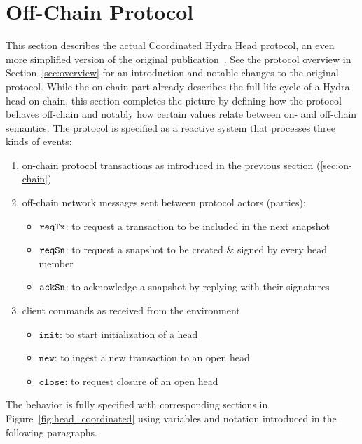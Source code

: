 \section{Off-Chain Protocol}\label{sec:offchain}

This section describes the actual Coordinated Hydra Head protocol, an even more
simplified version of the original publication~\cite{hydrahead20}. See the
protocol overview in Section~\ref{sec:overview} for an introduction and notable
changes to the original protocol. While the on-chain part already describes the
full life-cycle of a Hydra head on-chain, this section completes the picture by
defining how the protocol behaves off-chain and notably how certain values
relate between on- and off-chain semantics. The protocol is specified as a
reactive system that processes three kinds of events:
\begin{enumerate}
  \item on-chain protocol transactions as introduced in the previous section (\ref{sec:on-chain})
  \item off-chain network messages sent between protocol actors (parties):
    \begin{itemize}
      \item $\mathtt{reqTx}$: to request a transaction to be included in the next snapshot
      \item $\mathtt{reqSn}$: to request a snapshot to be created \& signed by every head member
      \item $\mathtt{ackSn}$: to acknowledge a snapshot by replying with their signatures
    \end{itemize}
  \item client commands as received from the environment
    \begin{itemize}
      \item $\mathtt{init}$: to start initialization of a head
      \item $\mathtt{new}$: to ingest a new transaction to an open head
      \item $\mathtt{close}$: to request closure of an open head
    \end{itemize}
\end{enumerate}

The behavior is fully specified with corresponding sections in
Figure~\ref{fig:head_coordinated} using variables and notation introduced in the
following paragraphs.

